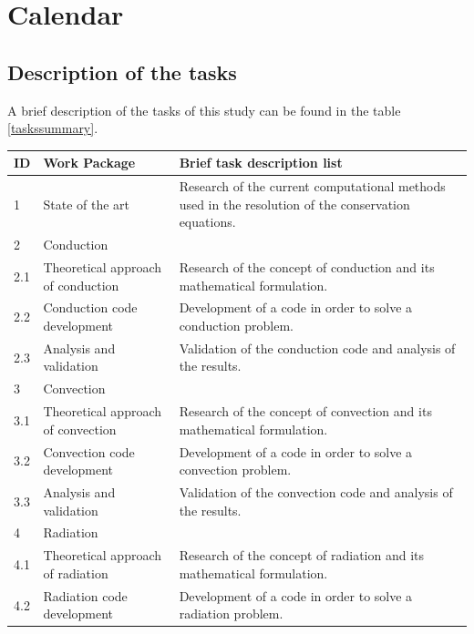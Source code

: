 
\section{Calendar}
\subsection{Description of the tasks}
A brief description of the tasks of this study can be found in the table \ref{taskssummary}.
\begin{longtable}{ | p{1.3cm} | p{3cm} | p{11cm} |}
\hline
\textbf{ID} & \textbf{Work Package} & \textbf{Brief task description list} \\ 
\hline
1 & State of the art & Research of the current computational methods used in the resolution of the conservation equations.\\ \hline
2 & \multicolumn{2}{|l|}{Conduction} \\ \hline
2.1 & Theoretical approach of conduction & Research of the concept of conduction and its mathematical formulation. \\ \hline
2.2 & Conduction code development & Development of a code in order to solve a conduction problem. \\ \hline
2.3 & Analysis and validation &  Validation of the conduction code and analysis of the results. \\ \hline
3 & \multicolumn{2}{|l|}{Convection} \\ \hline
3.1 & Theoretical approach of convection & Research of the concept of convection and its mathematical formulation. \\ \hline
3.2 & Convection code development & Development of a code in order to solve a convection problem. \\ \hline
3.3 & Analysis and validation &  Validation of the convection code and analysis of the results. \\ \hline
4 & \multicolumn{2}{|l|}{Radiation} \\ \hline
4.1 & Theoretical approach of radiation & Research of the concept of radiation and its mathematical formulation. \\ \hline
4.2 & Radiation code development & Development of a code in order to solve a radiation problem. \\ \hline

\end{longtable}
